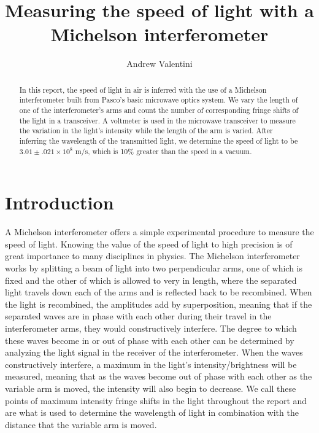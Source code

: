 \documentclass[reprint,amsmath,amssymb,aps,prb,nofootinbib,floatfix]{revtex4-2}
\begin{document}
 

\vspace*{25pt}
\title{Measuring the speed of light with a Michelson interferometer}
\author{Andrew Valentini}

\begin{abstract}
    In this report, the speed of light in air is inferred with the use of a Michelson interferometer built from Pasco's basic microwave optics system. We vary the length of one of the interferometer's arms and count the number of corresponding fringe shifts of the light in a transceiver. A voltmeter is used in the microwave transceiver to measure the variation in the light's intensity while the length of the arm is varied. After inferring the wavelength of the transmitted light, we determine the speed of light to be $3.01 \pm .021 \times 10^8$ m/s, which is 10$\%$ greater than the speed in a vacuum. 
\end{abstract}

\maketitle
\section{Introduction}
A Michelson interferometer offers a simple experimental procedure to measure the speed of light. Knowing the value of the speed of light to high precision is of great importance to many disciplines in physics. The Michelson interferometer works by splitting a beam of light into two perpendicular arms, one of which is fixed and the other of which is allowed to very in length, where the separated light travels down each of the arms and is reflected back to be recombined. When the light is recombined, the amplitudes add by superposition, meaning that if the separated waves are in phase with each other during their travel in the interferometer arms, they would constructively interfere. The degree to which these waves become in or out of phase with each other can be determined by analyzing the light signal in the receiver of the interferometer. When the waves constructively interfere, a maximum in the light's intensity/brightness will be measured, meaning that as the waves become out of phase with each other as the variable arm is moved, the intensity will also begin to decrease. We call these points of maximum intensity fringe shifts in the light throughout the report and are what is used to determine the wavelength of light in combination with the distance that the variable arm is moved.  
\end{document}
